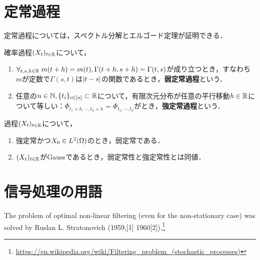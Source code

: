 \documentclass[uplatex,dvipdfmx]{jsreport}
\begin{document}
\section{定常過程}

\begin{tcolorbox}[colframe=ForestGreen, colback=ForestGreen!10!white,breakable,colbacktitle=ForestGreen!40!white,coltitle=black,fonttitle=\bfseries\sffamily,
title=]
    定常過程については，スペクトル分解とエルゴード定理が証明できる．
\end{tcolorbox}

\begin{definition}
    確率過程$(X_t)_{t\in\mathbb{R}}$について，
    \begin{enumerate}
        \item $\forall_{t,s,h\in\mathbb{R}}\;m(t+h)=m(t),\Gamma(t+h,s+h)=\Gamma(t,s)$が成り立つとき，すなわち$m$が定数で$\Gamma(s,t)$は$\lvert t-s\rvert$の関数であるとき，\textbf{弱定常過程}という．
        \item 任意の$n\in\mathbb{N},\{t_i\}_{i\in[n]}\subset\mathbb{R}$について，有限次元分布が任意の平行移動$h\in\mathbb{R}$について等しい：$\Phi_{t_1+h,\cdots,t_n+h}=\Phi_{t_1,\cdots,t_n}$がとき，\textbf{強定常過程}という．
    \end{enumerate}
\end{definition}

\begin{lemma}
    過程$(X_t)_{t\in\mathbb{R}}$について，
    \begin{enumerate}
        \item 強定常かつ$X_0\in L^2(\Omega)$のとき，弱定常である．
        \item $(X_t)_{t\in\mathbb{R}}$がGaussであるとき，弱定常性と強定常性とは同値．
    \end{enumerate}
\end{lemma}

\section{信号処理の用語}

\begin{tcolorbox}[colframe=ForestGreen, colback=ForestGreen!10!white,breakable,colbacktitle=ForestGreen!40!white,coltitle=black,fonttitle=\bfseries\sffamily,
title=]
The problem of optimal non-linear filtering (even for the non-stationary case) was solved by Ruslan L. Stratonovich (1959,[1] 1960[2]).\footnote{\url{https://en.wikipedia.org/wiki/Filtering_problem_(stochastic_processes)}}
\end{tcolorbox}
\end{document}

